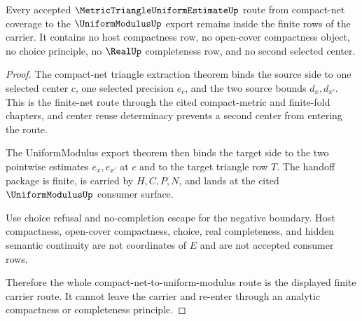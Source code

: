 \begin{theorem}
\label{thm:metric-triangle-uniform-estimate-finite-route-nonescape}
Every accepted $\MetricTriangleUniformEstimateUp$ route from compact-net coverage to the $\UniformModulusUp$ export remains inside the finite rows of the carrier. It contains no host compactness row, no open-cover compactness object, no choice principle, no $\RealUp$ completeness row, and no second selected center.
\end{theorem}
\begin{proof}
The compact-net triangle extraction theorem binds the source side to one selected center $c$, one selected precision $e_c$, and the two source bounds $d_x,d_{x'}$. This is the finite-net route through the cited compact-metric and finite-fold chapters, and center reuse determinacy prevents a second center from entering the route.

The UniformModulus export theorem then binds the target side to the two pointwise estimates $e_x,e_{x'}$ at $c$ and to the target triangle row $T$. The handoff package is finite, is carried by $H,C,P,N$, and lands at the cited $\UniformModulusUp$ consumer surface.

Use choice refusal and no-completion escape for the negative boundary. Host compactness, open-cover compactness, choice, real completeness, and hidden semantic continuity are not coordinates of $E$ and are not accepted consumer rows.

Therefore the whole compact-net-to-uniform-modulus route is the displayed finite carrier route. It cannot leave the carrier and re-enter through an analytic compactness or completeness principle.
\end{proof}

